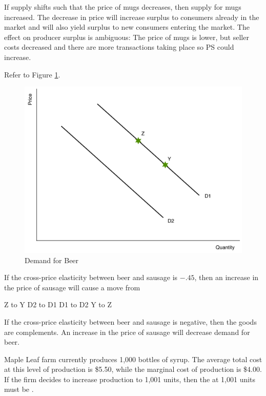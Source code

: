\documentclass[addpoints,11pt]{exam}
\theoremstyle{definition}
\newcommand{\blank}[0]{\underline{\hspace{3cm}}}
\begin{document}
\begin{questions}
\begin{solution}
If supply shifts such that the price of mugs decreases, then supply for mugs increased. The decrease in price will increase surplus to consumers already in the market and will also yield surplus to new consumers entering the market. The effect on producer surplus is ambiguous: The price of mugs is lower, but seller costs decreased and there are more transactions taking place so PS could increase.
\end{solution}

\question Refer to Figure \ref{fig1}. 

\begin{figure}[h!]
	\centering
	\includegraphics[scale=.35]{Exam1_MC2.pdf}
	\caption{Demand for Beer}
	\label{fig1}
\end{figure}

If the cross-price elasticity between beer and sausage is $-.45$, then an increase in the price of sausage will cause a move from

\begin{choices}
	\choice Z to Y
	\choice D2 to D1
	\CorrectChoice D1 to D2
	\choice Y to Z
\end{choices}

\begin{solution}
If the cross-price elasticity between beer and sausage is negative, then the goods are complements. An increase in the price of sausage will decrease demand for beer.
\end{solution}

\question Maple Leaf farm currently produces 1,000 bottles of syrup. The average total cost at this level of production is \$5.50, while the marginal cost of production is \$4.00. If the firm decides to increase production to 1,001 units, then the \blank at 1,001 units must be \blank. 


\end{questions}
\end{document}
